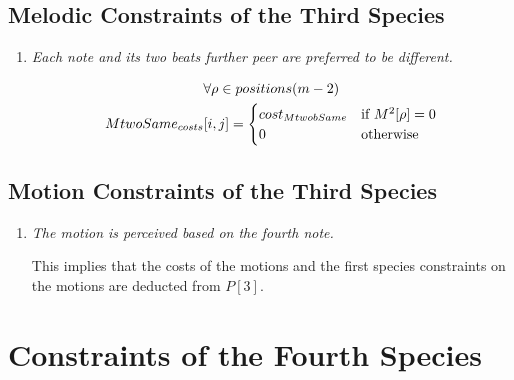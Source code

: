 \subsection*{Melodic Constraints of the Third Species}
\begin{enumerate}[wide, label=\bfseries 3.M\arabic*]
  \item\label{rule:twobeats} {\textit{Each note and its two beats further peer are preferred to be different.}}


\begin{equation}
    \begin{gathered}
        \forall \rho \in positions(m-2) \\
        MtwoSame_{costs}[i, j] = \begin{cases}
            cost_{MtwobSame} & \text{if } M^2[\rho] = 0\\
            0 & \text{otherwise}
        \end{cases}
    \end{gathered}
\end{equation}
\end{enumerate}
\subsection*{Motion Constraints of the Third Species}
\begin{enumerate}[wide, label=\bfseries 3.P\arabic*]
  \item\label{rule:motion3rd} {\textit{The motion is perceived based on the fourth note.}}

This implies that the costs of the motions and the first species constraints on the motions are deducted from $P[3]$.
\end{enumerate}


\section*{Constraints of the Fourth Species}

